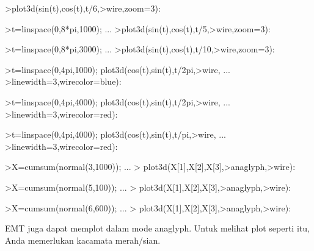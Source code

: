 \documentclass[a4paper,10pt]{article}
\begin{document}
\begin{eulernotebook}
\begin{eulercomment}
\begin{eulercomment}
\begin{eulerprompt}
>plot3d(sin(t),cos(t),t/6,>wire,zoom=3):
\end{eulerprompt}
\begin{eulerprompt}
>t=linspace(0,8*pi,1000); ...
>plot3d(sin(t),cos(t),t/5,>wire,zoom=3):
\end{eulerprompt}
\begin{eulerprompt}
>t=linspace(0,8*pi,3000); ...
>plot3d(sin(t),cos(t),t/10,>wire,zoom=3):
\end{eulerprompt}
\begin{eulerprompt}
>t=linspace(0,4pi,1000); plot3d(cos(t),sin(t),t/2pi,>wire, ...
>linewidth=3,wirecolor=blue):
\end{eulerprompt}
\begin{eulerprompt}
>t=linspace(0,4pi,4000); plot3d(cos(t),sin(t),t/2pi,>wire, ...
>linewidth=3,wirecolor=red):
\end{eulerprompt}
\begin{eulerprompt}
>t=linspace(0,4pi,4000); plot3d(cos(t),sin(t),t/pi,>wire, ...
>linewidth=3,wirecolor=red):
\end{eulerprompt}
\begin{eulerprompt}
>X=cumsum(normal(3,1000)); ...
> plot3d(X[1],X[2],X[3],>anaglyph,>wire):
\end{eulerprompt}
\begin{eulerprompt}
>X=cumsum(normal(5,100)); ...
> plot3d(X[1],X[2],X[3],>anaglyph,>wire):
\end{eulerprompt}
\begin{eulerprompt}
>X=cumsum(normal(6,600)); ...
> plot3d(X[1],X[2],X[3],>anaglyph,>wire):
\end{eulerprompt}
\begin{eulercomment}
EMT juga dapat memplot dalam mode anaglyph. Untuk melihat plot seperti
itu, Anda memerlukan kacamata merah/sian.
\end{eulercomment}

\end{eulercomment}
\end{eulercomment}
\end{eulernotebook}
\end{document}
